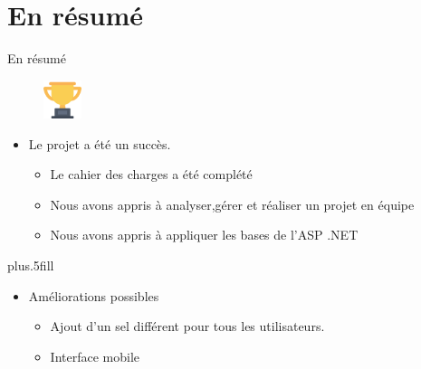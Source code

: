 \section*{En résumé}

\begin{frame}{En résumé}
\begin{figure}[h!]
  \includegraphics[width=0.10\textwidth]{images/Winner_1-512}
\end{figure}
  \begin{itemize}
  \item
    Le projet a été un succès.
 \begin{itemize}
  \item
    Le cahier des charges a été complété
  \item
    Nous avons appris à analyser,gérer et réaliser un projet en équipe
\item Nous avons appris à appliquer les bases de l'ASP .NET
 \end{itemize}
  \end{itemize}
  
  \vskip0pt plus.5fill
  \begin{itemize}
  \item
    Améliorations possibles
    \begin{itemize}
     \item Ajout d'un sel différent pour tous les utilisateurs.
     \item Interface mobile
    \end{itemize}
  \end{itemize}
\end{frame}
